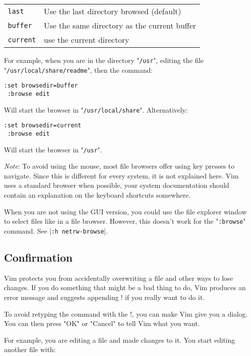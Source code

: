 \begin{center} \begin{tabular}{l l}
				\texttt{last} & Use the last directory browsed (default) \\
				\texttt{buffer} & Use the same directory as the current buffer \\
				\texttt{current} & use the current directory \\
\end{tabular} \end{center}

For example, when you are in the directory "\texttt{/usr}", editing the file "\texttt{/usr/local/share/readme}", then the command:

\begin{Verbatim}[samepage=true]
 :set browsedir=buffer
 :browse edit
\end{Verbatim}

Will start the browser in "\texttt{/usr/local/share}".
Alternatively:

\begin{Verbatim}[samepage=true]
 :set browsedir=current
 :browse edit
\end{Verbatim}

Will start the browser in "\texttt{/usr}".

\emph{Note}: To avoid using the mouse, most file browsers offer using key presses to navigate.
Since this is different for every system, it is not explained here.
Vim uses a standard browser when possible, your system documentation should contain an explanation on the keyboard shortcuts somewhere.

When you are not using the GUI version, you could use the file explorer window to select files like in a file browser.
However, this doesn't work for the "\texttt{:browse}" command.
See |\texttt{:h netrw-browse}|.
\subsection{Confirmation}
Vim protects you from accidentally overwriting a file and other ways to lose changes.
If you do something that might be a bad thing to do, Vim produces an error message and suggests appending ! if you really want to do it.

To avoid retyping the command with the !, you can make Vim give you a dialog.
You can then press "OK" or "Cancel" to tell Vim what you want.

For example, you are editing a file and made changes to it.
You start editing another file with:

